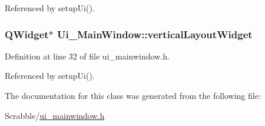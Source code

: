 Referenced by setup\-Ui().

\hypertarget{class_ui___main_window_a805d415fff07a22a85219e1f22f2da28}{
\subsubsection[{vertical\-Layout\-Widget}]{\setlength{\rightskip}{0pt plus 5cm}Q\-Widget$\ast$ Ui\-\_\-\-Main\-Window\-::vertical\-Layout\-Widget}}\label{class_ui___main_window_a805d415fff07a22a85219e1f22f2da28}


Definition at line 32 of file ui\-\_\-mainwindow.\-h.



Referenced by setup\-Ui().



The documentation for this class was generated from the following file\-:\begin{DoxyCompactItemize}
\item 
Scrabble/\hyperlink{ui__mainwindow_8h}{ui\-\_\-mainwindow.\-h}\end{DoxyCompactItemize}
